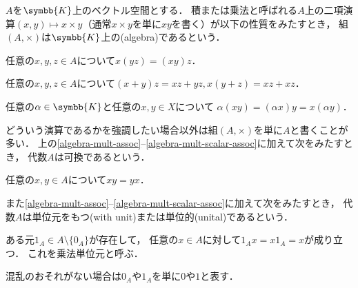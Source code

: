 \documentclass[../main.tex]{subfiles}
\begin{document}
\nocite{miyajima-functional-analysis}

\begin{thmbox}
\begin{definition}[（代数）]
\(A\)を\(\symbb{K}\)上のベクトル空間とする．
積または乗法と呼ばれる\(A\)上の二項演算\((x, y) \mapsto x \mathbin{\times} y\)（通常\(x \mathbin{\times} y\)を単に\(xy\)を書く）が以下の性質をみたすとき，
組\((A, \mathord{\times})\)は\(\symbb{K}\)上の(algebra)であるという．
\begin{conditions}
    \item\label{algebra-mult-assoc} 任意の\(x, y, z \in A\)について\(x (yz) = (xy) z\)．
    \item 任意の\(x, y, z \in A\)について\((x + y) z = xz + yz, x (y + z) = xz + xz\)．
    \item\label{algebra-mult-scalar-assoc} 任意の\(\alpha \in \symbb{K}\)と任意の\(x, y \in X\)について
        \(\alpha (xy) = (\alpha x) y = x (\alpha y)\)．
\end{conditions}
どういう演算であるかを強調したい場合以外は組\((A, \mathord{\times})\)を単に\(A\)と書くことが多い．
上の\ref{algebra-mult-assoc}--\ref{algebra-mult-scalar-assoc}に加えて次をみたすとき，
代数\(A\)は可換であるという．
\begin{conditions}[resume]
    \item 任意の\(x, y\in A\)について\(x y  = y x\)．
\end{conditions}
また\ref{algebra-mult-assoc}--\ref{algebra-mult-scalar-assoc}に加えて次をみたすとき，
代数\(A\)は単位元をもつ(with unit)または単位的(unital)であるという．
\begin{conditions}[resume]
    \item ある元\(1_A \in A \setminus \{0_A\}\)が存在して，
        任意の\(x \in A\)に対して\(1_A x  = x 1_A = x\)が成り立つ．
        これを乗法単位元と呼ぶ．
\end{conditions}
\end{definition}
\end{thmbox}

\noindent 混乱のおそれがない場合は\(0_A\)や\(1_A\)を単に\(0\)や\(1\)と表す．
\end{document}
